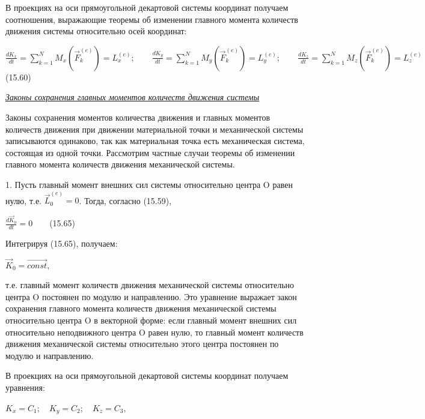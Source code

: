 {\begin{center}
    \par В проекциях на оси прямоугольной декартовой системы координат получаем соотношения, выражающие  теоремы  об изменении  главного  момента количеств движения системы относительно осей координат:

    \par $\frac{d{K}_x}{dt}=\sum\limits_{k=1}^N {M}_x(\vec{F}_k^{(e)})={L}_x^{(e)};\qquad \frac{d{K}_y}{dt}=\sum\limits_{k=1}^N {M}_y(\vec{F}_k^{(e)})={L}_y^{(e)}; \qquad \frac{d{K}_z}{dt}=\sum\limits_{k=1}^N {M}_z(\vec{F}_k^{(e)})={L}_z^{(e)} \qquad$ (15.60)

    \par \textit {\underline{Законы сохранения главных моментов   количеств движения системы}}    

    \par Законы сохранения моментов количества движения и главных моментов количеств движения при движении материальной точки и механической системы записываются одинаково, так как материальная точка есть механическая система, состоящая из одной точки. Рассмотрим частные случаи теоремы об изменении главного момента количеств движения механической системы.

    \par {1.} Пусть главный момент внешних сил системы относительно центра O равен нулю, т.е. $\vec{L}_{0}^{(e)}=0$. Тогда, согласно (15.59),

    \par $\frac{d\vec{K}_{0}}{dt}=0 \qquad$(15.65)

    \par Интегрируя (15.65), получаем:

    \par $\vec{K}_{0}=\overrightarrow{const},$

    \par т.е. главный момент количеств движения механической системы относительно центра O постоянен по модулю и направлению. Это уравнение выражает закон сохранения главного момента количеств движения механической системы относительно центра O в векторной форме: если главный момент внешних сил относительно неподвижного центра O равен нулю, то главный момент количеств движения механической системы относительно этого центра постоянен по модулю и направлению.

    \par В проекциях на оси прямоугольной декартовой системы координат получаем уравнения:

    \par $K_x=C_1; \quad K_y=C_2; \quad K_z=C_3,$


\end{center}}
